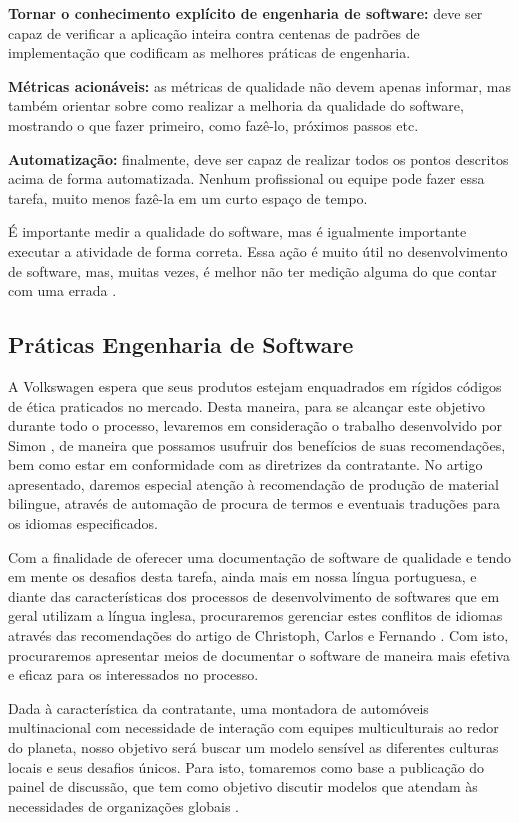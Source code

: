 \documentclass[12pt]{article}
\begin{document}
\textbf{ Tornar o conhecimento explícito de engenharia de software:} deve ser capaz de verificar a aplicação inteira contra centenas de padrões de implementação que codificam as melhores práticas de engenharia.

\textbf{Métricas acionáveis:} as métricas de qualidade não devem apenas informar, mas também orientar sobre como realizar a melhoria da qualidade do software, mostrando o que fazer primeiro, como fazê-lo, próximos passos etc.

\textbf{Automatização:} finalmente, deve ser capaz de realizar todos os pontos descritos acima de forma automatizada. Nenhum profissional ou equipe pode fazer essa tarefa, muito menos fazê-la em um curto espaço de tempo.

É importante medir a qualidade do software, mas é igualmente
importante executar a atividade de forma correta. Essa ação é muito útil no desenvolvimento de software, mas, muitas vezes, é melhor não ter medição alguma do que contar com uma errada \cite{COMPUTERWORLD}.

\subsection{Práticas Engenharia de Software}

A Volkswagen espera que seus produtos estejam enquadrados em rígidos códigos de ética praticados no mercado. Desta maneira, para se alcançar este objetivo durante todo o processo, levaremos em consideração o trabalho desenvolvido 
por Simon \cite{rogerson2002software}, de maneira que possamos usufruir dos benefícios de suas recomendações, bem como estar em conformidade com as diretrizes da contratante. No artigo apresentado, daremos especial atenção à recomendação de produção de material bilingue, através de automação de procura de termos e eventuais traduções para os idiomas especificados. 

Com a finalidade de oferecer uma documentação de software de qualidade e tendo em mente os desafios desta tarefa, ainda mais em nossa língua portuguesa, e diante das características dos processos de desenvolvimento de softwares que em geral utilizam a língua inglesa, procuraremos gerenciar estes conflitos de idiomas através das recomendações do artigo de Christoph, Carlos e Fernando \cite{Treude2015}. Com isto, procuraremos apresentar meios de documentar o software de maneira mais efetiva e eficaz para os interessados no processo.

Dada à característica da contratante, uma montadora de automóveis multinacional com necessidade de interação com equipes multiculturais ao redor do planeta, nosso objetivo será buscar um modelo sensível as diferentes culturas locais e seus desafios únicos. Para isto, tomaremos como base a publicação do painel de discussão, que tem como objetivo discutir modelos que atendam às necessidades de organizações globais \cite{Subramanyan2009}.
\end{document}
